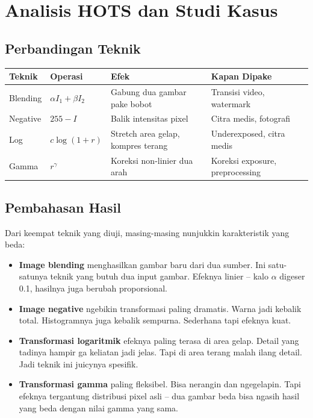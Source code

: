 \documentclass[11pt,a4paper]{article}
\begin{document}
\section{Analisis HOTS dan Studi Kasus}

\subsection{Perbandingan Teknik}

\begin{center}
\begin{tabularx}{\textwidth}{l l X l}
\toprule
Teknik & Operasi & Efek & Kapan Dipake \\
\midrule
Blending & $\alpha I_1 + \beta I_2$ & Gabung dua gambar pake bobot & Transisi video, watermark \\
Negative & $255 - I$ & Balik intensitas pixel & Citra medis, fotografi \\
Log & $c\log(1+r)$ & Stretch area gelap, kompres terang & Underexposed, citra medis \\
Gamma & $r^\gamma$ & Koreksi non-linier dua arah & Koreksi exposure, preprocessing \\
\bottomrule
\end{tabularx}
\end{center}

\subsection{Pembahasan Hasil}

Dari keempat teknik yang diuji, masing-masing nunjukkin karakteristik yang beda:

\begin{itemize}
    \item \textbf{Image blending} menghasilkan gambar baru dari dua sumber. Ini satu-satunya teknik yang butuh dua input gambar. Efeknya linier -- kalo $\alpha$ digeser 0.1, hasilnya juga berubah proporsional.
    \item \textbf{Image negative} ngebikin transformasi paling dramatis. Warna jadi kebalik total. Histogramnya juga kebalik sempurna. Sederhana tapi efeknya kuat.
    \item \textbf{Transformasi logaritmik} efeknya paling terasa di area gelap. Detail yang tadinya hampir ga keliatan jadi jelas. Tapi di area terang malah ilang detail. Jadi teknik ini juicynya spesifik.
    \item \textbf{Transformasi gamma} paling fleksibel. Bisa nerangin dan ngegelapin. Tapi efeknya tergantung distribusi pixel asli -- dua gambar beda bisa ngasih hasil yang beda dengan nilai gamma yang sama.
\end{itemize}
\end{document}
